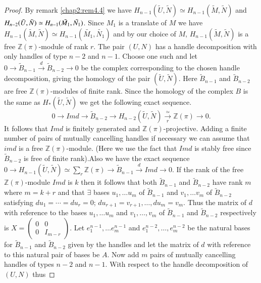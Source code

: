 \begin{proof}
By remark \ref{chap2:rem4.4} we have $H_{n-1}(\tilde{U}, \tilde{N})\simeq
H_{n-1}(\tilde{M}, \tilde{N})$ and $H_{n-2}(\tilde{U},\break
\tilde{N})\simeq H_{n-1}(\tilde{M_1}, \tilde{N_1})$. Since $M_1$ is a
translate of $M$ we have $H_{n-1}(\tilde{M}, \tilde{N})\simeq
H_{n-1}(\tilde{M_1}, \tilde{N_1})$ and by our choice of $M$,
$H_{n-1}(\tilde{M}, \tilde{N})$ is a free $\mathbb{Z}(\pi)$-module of
rank $r$. The pair $(U,N)$ has a handle decomposition with only handles
of type $n-2$ and $n-1$. Choose one such and let $0 \to
\tilde{B}_{n-1} \xrightarrow{d} \tilde{B}_{n-2} \to 0$ be the complex
corresponding to the chosen handle decomposition, giving the homology
of the pair $(\tilde{U}, \tilde{N})$. Here $\tilde{B}_{n-1}$ and
$\tilde{B}_{n-2}$ are free $\mathbb{Z}(\pi)$-modules of finite
rank. Since the homology of the complex $B$ is the same as $H_*
(\tilde{U}, \tilde{N})$ we get the following exact sequence. 
$$
0 \to Imd \to \tilde{B}_{n-2} \to H_{n-2} (\tilde{U}, \tilde{N})
\xrightarrow[{r}]{\simeq}\mathbb{Z}(\pi)\to 0. 
$$
It follows that $Imd$ is finitely generated and
$\mathbb{Z}(\pi)$-projective. Adding a finite number of pairs of
mutually cancelling handles if necessary we can assume that $imd$ is a
free $\mathbb{Z}(\pi)$-module. (Here we use the fact that $Imd$ is
stably free since $\tilde{B}_{n-2}$ is free of finite
rank).\pageoriginale Also we 
have the exact sequence $0 \to H_{n-1} (\tilde{U}, \tilde{N})\simeq
\sum \limits_r \mathbb{Z}(\pi) \to \tilde {B}_{n-1} \xrightarrow{d}
Imd \to 0$. If the rank of the free $\mathbb{Z}(\pi)$-module $Imd$ is
$k$ then it follows that both $\tilde{B}_{n-1}$ and $\tilde{B}_{n-2}$
have rank $m$ where $m= k+r$ and that $\exists$ bases $u_1, \ldots
u_m$ of $\tilde{B}_{n-1}$ and $v_1, \ldots v_m$ of $\tilde{B}_{n-2}$
satisfying $du_1=\cdots =du_r= 0$; $du_{r+1} = v_{r+1}, \ldots, du_m
= v_m$. Thus the matrix of $d$ with reference to the bases $u_1,
\ldots u_m$ and $v_1, \ldots, v_m$ of $\tilde{B}_{n-1}$ and
$\tilde{B}_{n-2}$ respectively is $X= \left( \begin{smallmatrix} 0&
  0\\ 0& I_{m-r} \end{smallmatrix}\right)$. Let $e_1^{n-1}, \ldots
e_m^{n-1}$ and $e_1^{n-2}, \ldots, e_m^{n-2}$ be the natural bases for
$\tilde{B}_{n-1}$ and $\tilde{B}_{n-2}$ given by the handles and let
the matrix of $d$ with reference to this natural pair of bases be
$A$. Now add $m$ pairs of mutually cancelling handles of types $n-2$
and $n-1$. With respect to the handle decomposition of $(U, N)$ thus

\end{proof}
